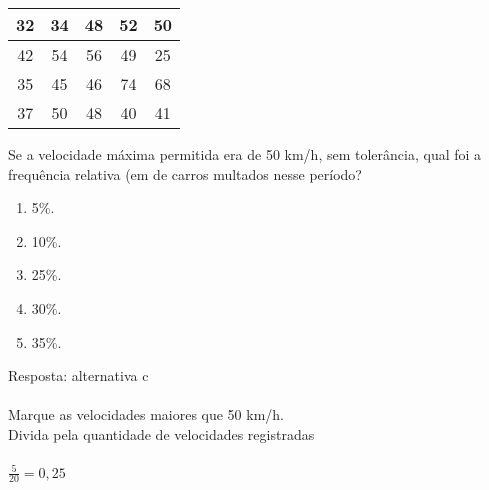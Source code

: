 \documentclass[a4paper,14pt]{article}
\begin{document}
\begin{enumerate}
        \begin{tabular}{|c|c|c|c|c|} %
        	\hline %
        	32 & 34 & 48 & 52 & 50 \\ %
        	\hline %
        	42 & 54 & 56 & 49 & 25 \\ %
        	\hline %
        	35 & 45 & 46 & 74 & 68 \\ %
        	\hline %
        	37 & 50 & 48 & 40 & 41 \\ %
        	\hline %
        \end{tabular}
        \newline
        \newline
        Se a velocidade máxima permitida era de 50 km/h, sem tolerância, qual foi a frequência relativa (em %
        de carros multados nesse período?
        \newline
        \begin{enumerate}
        	\item 5\%.
        	\item 10\%.
        	\item 25\%.
        	\item 30\%.
        	\item 35\%.
        \end{enumerate}
        Resposta: alternativa c \\ \\
        Marque as velocidades maiores que 50 km/h. \\
        Divida pela quantidade de velocidades registradas \\ \\
        $\frac{5}{20} = 0,25$ \\
        \vspace{0cm}
        

\end{enumerate}
\end{document}
